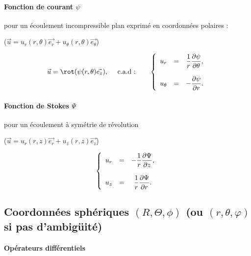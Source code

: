 \paragraph{Fonction de courant $\psi$}  pour un écoulement incompressible plan exprimé en coordonnées polaires :

($\vec{u} = u_r(r,\theta) \vec{e_r} + u_\theta(r,\theta) \vec{e_\theta}$)


\begin{equation}
 \vec{u} = \rot (\psi(r,\theta) \vec{e_z}), 
\quad \mbox{ c.a.d :} \quad \quad 
\left\{
\begin{array}{ccc}
\displaystyle u_r &=& \displaystyle \frac{1}{r}\dpa{\psi}{\theta}, \\ \\
\displaystyle u_\theta &=&  \displaystyle -\dpa{\psi}{r}.
\end{array}
\right.
\end{equation}


\paragraph{Fonction de Stokes $\Psi$}  pour un écoulement à symétrie de révolution

($\vec{u} = u_r(r,z) \vec{e_r} + u_z(r,z) \vec{e_z}$)


\begin{equation}
\left\{
\begin{array}{ccc}
\displaystyle u_r &=& \displaystyle - \frac{1}{r}\frac {\partial \Psi} {\partial z}, \\ \\
\displaystyle u_z &=& \displaystyle  \frac{1}{r}\frac {\partial \Psi} {\partial r}.
\end{array}
\right.
\end{equation}




\clearpage

\subsection{Coordonnées sphériques $(R,\Theta,\phi)$ (ou $(r,\theta,\varphi)$ si pas d'ambigüité) }

\paragraph{Opérateurs différentiels}

